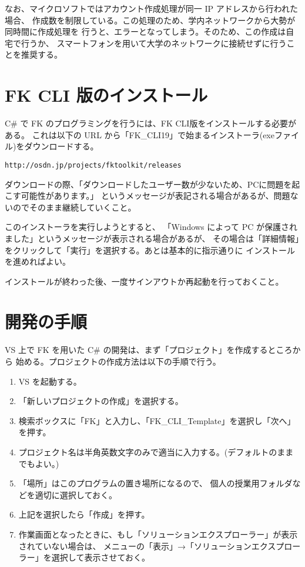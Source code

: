 \documentclass[a4paper]{jsarticle}
\begin{document}
なお、マイクロソフトではアカウント作成処理が同一 IP アドレスから行われた場合、
作成数を制限している。この処理のため、学内ネットワークから大勢が同時間に作成処理を
行うと、エラーとなってしまう。そのため、この作成は自宅で行うか、
スマートフォンを用いて大学のネットワークに接続せずに行うことを推奨する。

\section{FK CLI 版のインストール}

C\# で FK のプログラミングを行うには、FK CLI版をインストールする必要がある。
これは以下の URL から「FK\_CLI19」で始まるインストーラ(exeファイル)をダウンロードする。

\begin{screen}
\begin{center}
	\verb+http://osdn.jp/projects/fktoolkit/releases+
\end{center}
\end{screen}
ダウンロードの際、「ダウンロードしたユーザー数が少ないため、PCに問題を起こす可能性があります。」
というメッセージが表記される場合があるが、問題ないのでそのまま継続していくこと。

このインストーラを実行しようとすると、
「Windows によって PC が保護されました」というメッセージが表示される場合があるが、
その場合は「詳細情報」をクリックして「実行」を選択する。あとは基本的に指示通りに
インストールを進めればよい。

インストールが終わった後、一度サインアウトか再起動を行っておくこと。

\section{開発の手順}

VS 上で FK を用いた C\# の開発は、まず「プロジェクト」を作成するところから
始める。プロジェクトの作成方法は以下の手順で行う。

\begin{enumerate}

 \item VS を起動する。

 \item 「新しいプロジェクトの作成」を選択する。

 \item 検索ボックスに「FK」と入力し、「FK\_CLI\_Template」を選択し「次へ」を押す。

 \item プロジェクト名は半角英数文字のみで適当に入力する。(デフォルトのままでもよい。)

 \item 「場所」はこのプログラムの置き場所になるので、
		個人の授業用フォルダなどを適切に選択しておく。

 \item 上記を選択したら「作成」を押す。

 \item 作業画面となったときに、もし「ソリューションエクスプローラー」が表示されていない場合は、
	メニューの「表示」→「ソリューションエクスプローラー」を選択して表示させておく。

\end{enumerate}
\end{document}
